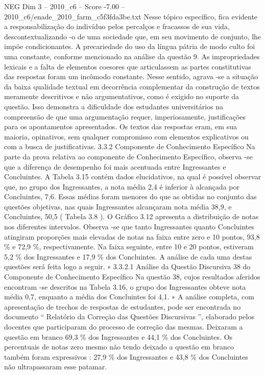 \begin{textsample}{NEG Dim 3 – 2010\_c6 – Score -7.00 – 2010\_c6/enade\_2010\_farm\_c5f3fda3be.txt}
Nesse tópico específico, fica evidente a responsabilização do indivíduo pelos percalços e fracassos de sua vida, descontextualizando -o de uma sociedade que, em seu movimento de conjunto, lhe impõe condicionantes.
A precariedade do uso da língua pátria de modo culto foi uma constante, conforme mencionado na análise da questão 9.
As impropriedades lexicais e a falta de elementos coesores que articulassem as partes constitutivas das respostas foram um incômodo constante.
Nesse sentido, agrava -se a situação da baixa qualidade textual em decorrência complementar da construção de textos meramente descritivos e não argumentativos, como é exigido no suporte da questão.
Isso demonstra a dificuldade dos estudantes universitários na compreensão de que uma argumentação requer, imperiosamente, justificações para os apontamentos apresentados.
Os textos das respostas eram, em sua maioria, opinativos, sem qualquer compromisso com elementos explicativos ou com a busca de justificativas. 3.3.2 Componente de Conhecimento Específico Na parte da prova relativa ao componente de Conhecimento Específico, observa -se que a diferença de desempenho foi mais acentuada entre Ingressantes e Concluintes.
A Tabela 3.15 contém dados elucidativos, na qual é possível observar que, no grupo dos Ingressantes, a nota média 2,4 é inferior à alcançada por Concluintes, 7,6.
Essas médias foram menores do que as obtidas no conjunto das questões objetivas, nas quais Ingressantes alcançaram nota média 38,9, e Concluintes, 50,5 ( Tabela 3.8 ).
O Gráfico 3.12 apresenta a distribuição de notas nos diferentes intervalos.
Observa -se que tanto Ingressantes quanto Concluintes atingiram proporções mais elevadas de notas na faixa entre zero e 10 pontos, 93,8 \% e 72,9 \%, respectivamente.
Na faixa seguinte, entre 10 e 20 pontos, estiveram 5,2 \% dos Ingressantes e 17,9 \% dos Concluintes.
A análise de cada uma destas questões será feita logo a seguir. ∗ 3.3.2.1 Análise da Questão Discursiva 38 do Componente de Conhecimento Específico Na questão 38, cujos resultados aferidos encontram -se descritos na Tabela 3.16, o grupo dos Ingressantes obteve nota média 0,7, enquanto a média dos Concluintes foi 4,1. ∗ A análise completa, com apresentação de trechos de respostas de estudantes, pode ser encontrada no documento “ Relatório da Correção das Questões Discursivas ”, elaborado pelos docentes que participaram do processo de correção das mesmas.
Deixaram a questão em branco 69,3 \% dos Ingressantes e 44,1 \% dos Concluintes.
Os percentuais de notas zero mesmo não tendo deixado a questão em branco também foram expressivos : 27,9 \% dos Ingressantes e 43,8 \% dos Concluintes não ultrapassaram esse patamar.

\end{textsample}

